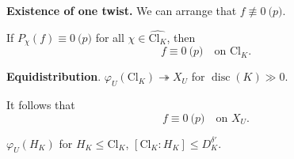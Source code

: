 \documentclass[reqno]{amsart} 
\begin{document}
\textbf{Existence of one twist.}  We can arrange that $f \not \equiv 0 \pod{p}$.

If $P_\chi(f) \equiv 0 \pod{p}$ for all $\chi \in \widehat{\mathrm{Cl}_K}$, then
\begin{equation*}
  f \equiv 0 \pod{p} \quad \text{on } \mathrm{Cl}_K.
\end{equation*}

\textbf{Equidistribution}. $\varphi_U(\mathrm{Cl}_K) \twoheadrightarrow X_U$ for $\operatorname{disc}(K) \gg 0$.

It follows that
\begin{equation*}
  f \equiv 0 \pod{p}\quad \text{on } X_U.
\end{equation*}

$\varphi_U(H_K)$ for $H_K \leq \mathrm{Cl}_K$, $[\mathrm{Cl}_K : H_K] \leq D_K^{\delta '}$.

{} 
\end{document}
